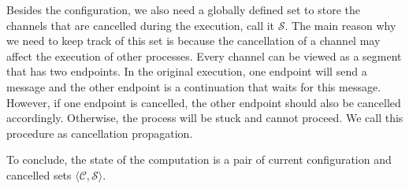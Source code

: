 \documentclass[12pt, openany]{memoir}
\newcommand*{\config}[0]{\mathcal{C}}
\newcommand*{\cancelSet}[0]{\mathcal{S}}
\begin{document}
Besides the configuration, we also need a globally defined set to store the channels that are cancelled during the execution, call it $\cancelSet$.
The main reason why we need to keep track of this set is because the cancellation of a channel may affect the execution of other processes.
Every channel can be viewed as a segment that has two endpoints. In the original execution, one endpoint will send a message and the other endpoint is a continuation that waits for this message.
However, if one endpoint is cancelled, the other endpoint should also be cancelled accordingly. 
Otherwise, the process will be stuck and cannot proceed. We call this procedure as cancellation propagation.

To conclude, the state of the computation is a pair of current configuration and cancelled sets $\langle \config, \cancelSet \rangle$.
\end{document}
